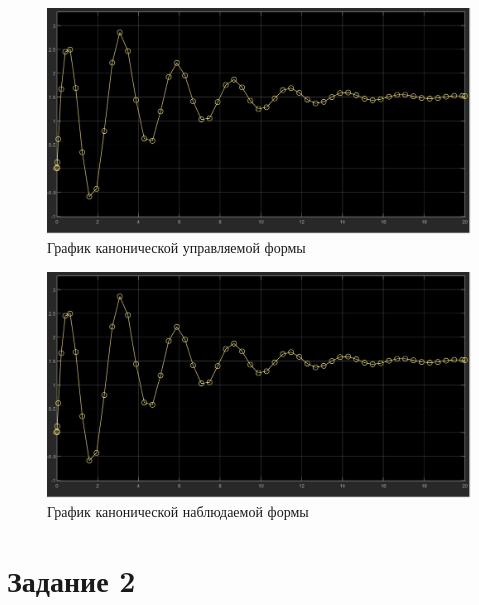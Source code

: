 \documentclass[a4paper, 12pt]{article}
\begin{document}
    \begin{figure}[H]
        \centering
        \includegraphics[scale=0.3]{canonical_controlled_form_1.jpg}
        \captionsetup{skip=0pt}
        \caption{График канонической управляемой формы}
        \label{fig:ccf1}
    \end{figure}
    \begin{figure}[H]
        \centering
        \includegraphics[scale=0.3]{canonical_observable_form_1.jpg}
        \captionsetup{skip=0pt}
        \caption{График канонической наблюдаемой формы}
        \label{fig:cof1}
    \end{figure}


    \section{Задание 2}
\end{document}
